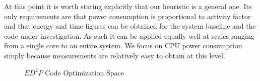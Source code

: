 At this point it is worth stating explicitly that our heuristic is a general one. Its only requirements are that power consumption is proportional to activity factor and that energy and time figures can be obtained for the system baseline and the code under investigation. As such it can be applied equally well at scales ranging from a single core to an entire system. We focus on CPU power consumption simply because measurements are relatively easy to obtain at this level.

\begin{figure}
\centering

\caption{$ED^2P$ Code Optimization Space}
\label{fig:multimetric-technique}
\end{figure}
